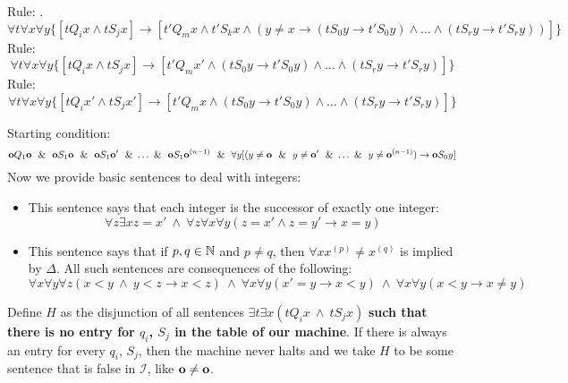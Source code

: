 \noindent Rule: .
\begin{equation}\label{writeTapeEdge}
\forall t\forall x\forall y \{[tQ_ix\land  tS_jx] \rightarrow [t'Q_mx\land  t'S_kx \land  (y\ne x \rightarrow (tS_0y\rightarrow t'S_0y)\land \dots\land (tS_ry\rightarrow t'S_ry))]\}
\end{equation}
Rule: 
\begin{equation}
\forall t\forall x\forall y\{[tQ_ix\land tS_jx]\rightarrow [t'Q_mx' \land  (tS_0y\rightarrow t'S_0y)\land \dots\land (tS_ry\rightarrow t'S_ry)]\}
\end{equation}
Rule: 
\begin{equation}
\forall t \forall x \forall y \{[tQ_ix' \land  tS_jx']\rightarrow [t'Q_mx\land  (tS_0y\rightarrow t'S_0y)\land \dots\land (tS_ry\rightarrow t'S_ry)]\}
\end{equation}

Starting condition:
\begin{equation}
\label{descOfZero}
\mathbf{o} Q_1 \mathbf{o}\ ~\&~ \ \mathbf{o} S_1\mathbf{o}\ ~\&~ \ \mathbf{o} S_1\mathbf{o} '\ ~\&~ \dots~\&~ \ \mathbf{o} S_1\mathbf{o}^{(n-1)}\ ~\&~ \ \forall y [(y\ne \mathbf{o}\ ~\&~ \ y\ne \mathbf{o}'\ ~\&~ \dots~\&~ \ y\ne \mathbf{o}^{(n-1)}) \rightarrow \mathbf{o} S_0y]
\end{equation}
Now we provide basic sentences to deal with integers:
\begin{itemize}
\item This sentence says that each integer is the successor of exactly one integer:
\begin{equation}\label{successorOfOneOther}
\forall z\exists x z = x'\ \land  \ \forall z\forall x\forall y (z=x'\land z=y'\rightarrow x=y)
\end{equation}
\item This sentence says that if $p,q\in\mathbb{N}$ and $p\ne q$, then $\forall x x^{(p)}\ne x^{(q)}$ is implied by $\Delta$. All such sentences are consequences of the following:
\begin{equation}\label{additionWorks}
\forall x\forall y\forall z (x < y\ \land \ y < z\rightarrow x<z)\ \land \ \forall x\forall y(x'=y\rightarrow x<y)\ \land \ \forall x\forall y(x<y\rightarrow x\ne y)
\end{equation}
\end{itemize}

Define $H$ as the disjunction of all sentences $\exists t\exists x (tQ_i x\ \land \ tS_jx)$ \textbf{such that there is no entry for $q_i$, $S_j$ in the table of our machine}. If there is always an entry for every $q_i$, $S_j$, then the machine never halts and we take $H$ to be some sentence that is false in $\mathscr{I}$, like $\mathbf{o}\ne \mathbf{o}$.
